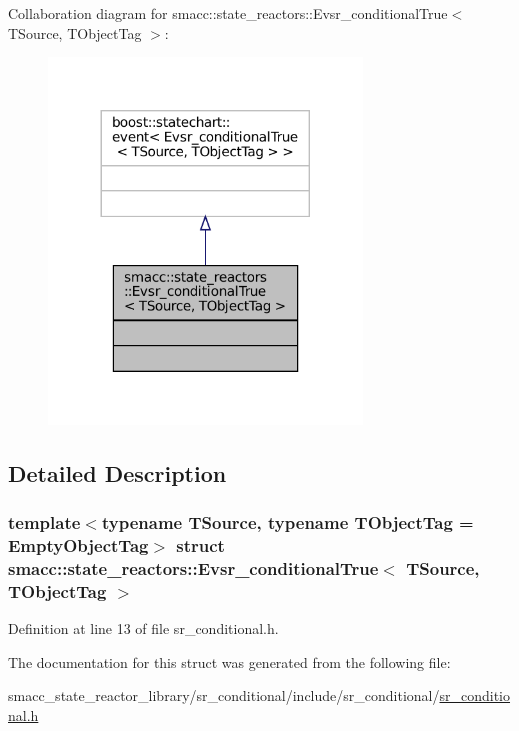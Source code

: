 Collaboration diagram for smacc\+:\+:state\+\_\+reactors\+:\+:Evsr\+\_\+conditional\+True$<$ T\+Source, T\+Object\+Tag $>$\+:
\nopagebreak
\begin{figure}[H]
\begin{center}
\leavevmode
\includegraphics[width=236pt]{structsmacc_1_1state__reactors_1_1Evsr__conditionalTrue__coll__graph}
\end{center}
\end{figure}


\subsection{Detailed Description}
\subsubsection*{template$<$typename T\+Source, typename T\+Object\+Tag = Empty\+Object\+Tag$>$\newline
struct smacc\+::state\+\_\+reactors\+::\+Evsr\+\_\+conditional\+True$<$ T\+Source, T\+Object\+Tag $>$}



Definition at line 13 of file sr\+\_\+conditional.\+h.



The documentation for this struct was generated from the following file\+:\begin{DoxyCompactItemize}
\item 
smacc\+\_\+state\+\_\+reactor\+\_\+library/sr\+\_\+conditional/include/sr\+\_\+conditional/\hyperlink{sr__conditional_8h}{sr\+\_\+conditional.\+h}\end{DoxyCompactItemize}
